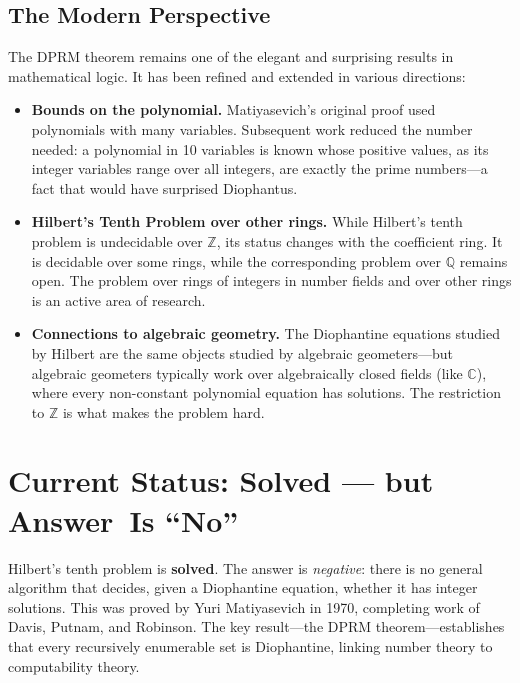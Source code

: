 \subsection{The Modern Perspective}

The DPRM theorem remains one of the elegant and surprising results in mathematical logic. It has been refined and extended in various directions:

\begin{itemize}
    \item \textbf{Bounds on the polynomial.} Matiyasevich's original proof used polynomials with many variables. Subsequent work reduced the number needed: a polynomial in 10 variables is known whose positive values, as its integer variables range over all integers, are exactly the prime numbers---a fact that would have surprised Diophantus.

    \item \textbf{Hilbert's Tenth Problem over other rings.} While Hilbert's tenth problem is undecidable over $\mathbb{Z}$, its status changes with the coefficient ring. It is decidable over some rings, while the corresponding problem over $\mathbb{Q}$ remains open. The problem over rings of integers in number fields and over other rings is an active area of research.

    \item \textbf{Connections to algebraic geometry.} The Diophantine equations studied by Hilbert are the same objects studied by algebraic geometers---but algebraic geometers typically work over algebraically closed fields (like $\mathbb{C}$), where every non-constant polynomial equation has solutions. The restriction to $\mathbb{Z}$ is what makes the problem hard.
\end{itemize}

\section{Current Status: Solved --- but Answer~Is ``No''}

\begin{solvedbox}
Hilbert's tenth problem is \textbf{solved}. The answer is \emph{negative}: there is no general algorithm that decides, given a Diophantine equation, whether it has integer solutions. This was proved by Yuri Matiyasevich in 1970, completing work of Davis, Putnam, and Robinson. The key result---the DPRM theorem---establishes that every recursively enumerable set is Diophantine, linking number theory to computability theory.
\end{solvedbox}


